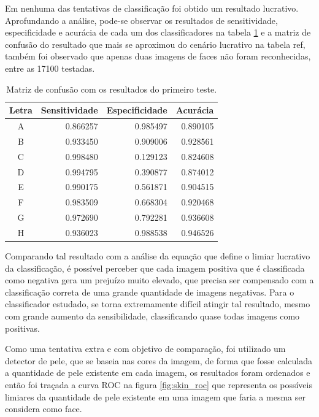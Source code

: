 Em nenhuma das tentativas de classificação foi obtido um resultado lucrativo. Aprofundando a análise, pode-se observar os resultados de sensitividade, especificidade e acurácia de cada um dos classificadores na tabela \ref{tab:results_data} e a matriz de confusão do resultado que mais se aproximou do cenário lucrativo na tabela ref{}, também foi observado que apenas duas imagens de faces não foram reconhecidas, entre as 17100 testadas.

\begin{table}[htbp]
     \caption{Matriz de confusão com os resultados do primeiro teste.}
     \label{tab:results_data}
     \centering
     \begin{tabular}{crrr}
      Letra & Sensitividade & Especificidade & Acurácia \\
      \midrule
           A & 0.866257 & 0.985497 & 0.890105 \\
           B & 0.933450 & 0.909006 & 0.928561 \\
           C & 0.998480 & 0.129123 & 0.824608 \\
           D & 0.994795 & 0.390877 & 0.874012 \\
           E & 0.990175 & 0.561871 & 0.904515 \\
           F & 0.983509 & 0.668304 & 0.920468 \\
           G & 0.972690 & 0.792281 & 0.936608 \\
           H & 0.936023 & 0.988538 & 0.946526 \\
      \end{tabular}
 \end{table}

Comparando tal resultado com a análise da equação que define o limiar lucrativo da classificação, é possível perceber que cada imagem positiva que é classificada como negativa gera um prejuízo muito elevado, que precisa ser compensado com a classificação correta de uma grande quantidade de imagens negativas. Para o classificador estudado, se torna extremamente difícil atingir tal resultado, mesmo com grande aumento da sensibilidade, classificando quase todas imagens como positivas.

Como uma tentativa extra e com objetivo de comparação, foi utilizado um detector de pele, que se baseia nas cores da imagem, de forma que fosse calculada a quantidade de pele existente em cada imagem, os resultados foram ordenados e então foi traçada a curva ROC na figura \ref{fig:skin_roc} que representa os possíveis limiares da quantidade de pele existente em uma imagem que faria a mesma ser considera como face.

